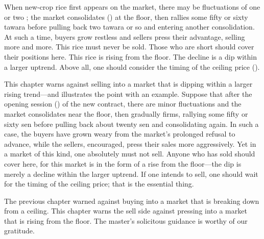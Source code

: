 \begin{sokyubox}
{\small\itshape\color{sokyubar} }

\medskip
When new-crop rice first appears on the market, there may be
fluctuations of one or two ; the market
consolidates () at the floor, then rallies some
fifty or sixty tawara before pulling back two tawara or so and
entering another consolidation. At such a time, buyers grow
restless and sellers press their advantage, selling more and more.
This rice must never be sold. Those
who are short should cover their positions here. This rice is
rising from the floor. The decline is a dip within a larger
uptrend. Above all, one should consider the timing of the ceiling
price ().
\end{sokyubox}

\commentary
This chapter warns against selling into a market that is dipping
within a larger rising trend---and illustrates the point with an
example. Suppose that after the opening session () of
the new contract, there are minor fluctuations and the market
consolidates near the floor, then gradually firms, rallying some
fifty or sixty sen before pulling back about twenty sen and
consolidating again. In such a case, the buyers have grown weary
from the market's prolonged refusal to advance, while the sellers,
encouraged, press their sales more aggressively.
Yet in a market of this kind, one absolutely must not sell.
Anyone who has sold should cover here, for this market is in the
form of a rise from the floor---the dip is merely a decline within
the larger uptrend. If one intends to sell, one should wait for
the timing of the ceiling price; that is the essential thing.

The previous chapter warned against buying into a market that is
breaking down from a ceiling. This chapter warns the sell side
against pressing into a market that is rising from the floor. The
master's solicitous guidance is worthy of our gratitude.


